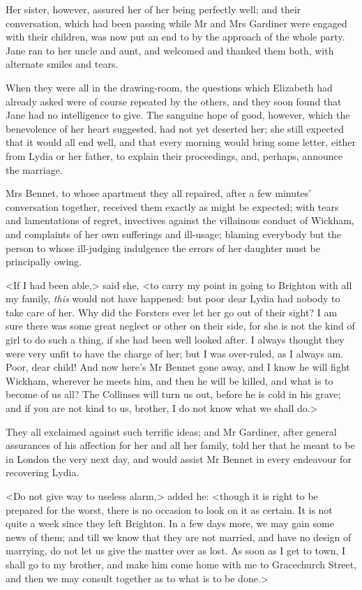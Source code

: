 Her sister, however, assured her of her being perfectly well; and their conversation, which had been passing while Mr and Mrs Gardiner were engaged with their children, was now put an end to by the approach of the whole party. Jane ran to her uncle and aunt, and welcomed and thanked them both, with alternate smiles and tears.

When they were all in the drawing-room, the questions which Elizabeth had already asked were of course repeated by the others, and they soon found that Jane had no intelligence to give. The sanguine hope of good, however, which the benevolence of her heart suggested, had not yet deserted her; she still expected that it would all end well, and that every morning would bring some letter, either from Lydia or her father, to explain their proceedings, and, perhaps, announce the marriage.

Mrs Bennet, to whose apartment they all repaired, after a few minutes' conversation together, received them exactly as might be expected; with tears and lamentations of regret, invectives against the villainous conduct of Wickham, and complaints of her own sufferings and ill-usage; blaming everybody but the person to whose ill-judging indulgence the errors of her daughter must be principally owing.

<If I had been able,> said she, <to carry my point in going to Brighton with all my family, \textit{this} would not have happened: but poor dear Lydia had nobody to take care of her. Why did the Forsters ever let her go out of their sight? I am sure there was some great neglect or other on their side, for she is not the kind of girl to do such a thing, if she had been well looked after. I always thought they were very unfit to have the charge of her; but I was over-ruled, as I always am. Poor, dear child! And now here's Mr Bennet gone away, and I know he will fight Wickham, wherever he meets him, and then he will be killed, and what is to become of us all? The Collinses will turn us out, before he is cold in his grave; and if you are not kind to us, brother, I do not know what we shall do.>

They all exclaimed against such terrific ideas; and Mr Gardiner, after general assurances of his affection for her and all her family, told her that he meant to be in London the very next day, and would assist Mr Bennet in every endeavour for recovering Lydia.

<Do not give way to useless alarm,> added he: <though it is right to be prepared for the worst, there is no occasion to look on it as certain. It is not quite a week since they left Brighton. In a few days more, we may gain some news of them; and till we know that they are not married, and have no design of marrying, do not let us give the matter over as lost. As soon as I get to town, I shall go to my brother, and make him come home with me to Gracechurch Street, and then we may consult together as to what is to be done.>

